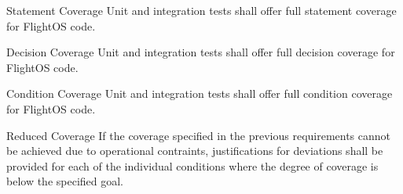  {Statement Coverage}{%
Unit and integration tests shall offer full statement coverage for FlightOS code.%
}{}%

 {Decision Coverage}{%
Unit and integration tests shall offer full decision coverage for FlightOS code.%
}{}%

 {Condition Coverage}{%
Unit and integration tests shall offer full condition coverage for FlightOS code.%
}{}%

 {Reduced Coverage}{%
If the coverage specified in the previous requirements cannot be achieved %
due to operational contraints, justifications for deviations shall be provided %
for each of the individual conditions where the degree of coverage is below %
the specified goal. %
}{}%












